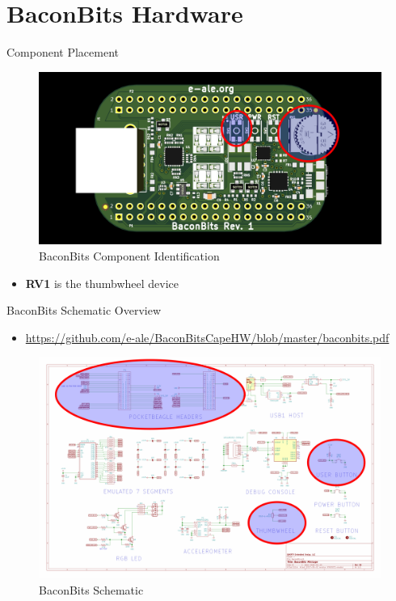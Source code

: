 \section{BaconBits Hardware}

\begin{frame}
   {Component Placement}

	     \begin{figure}[H]
		     \includegraphics[width=5in]{IMAGES/baconbits-mech-annotated}
				       \caption{BaconBits Component Identification}
	     \end{figure}
   \begin{itemize}
      \item
	      \textbf{RV1} is the thumbwheel device
   \end{itemize}
\end{frame}

\begin{frame}
	{BaconBits Schematic Overview}
	\begin{itemize}
		\item
			\url{https://github.com/e-ale/BaconBitsCapeHW/blob/master/baconbits.pdf}
	\end{itemize}


	     \begin{figure}[H]
		     \includegraphics[width=5in]{IMAGES/baconbits-schematic-annotated}
				       \caption{BaconBits Schematic}
	     \end{figure}
\end{frame}

